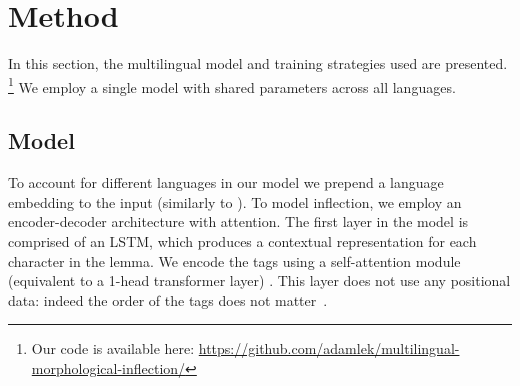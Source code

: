 \documentclass[11pt,a4paper]{article}
\begin{document}





\section{Method}

In this section, the multilingual model and training strategies used
are presented. \footnote{Our code is available here:
\url{https://github.com/adamlek/multilingual-morphological-inflection/}} We
employ a single model with shared parameters across all languages.

\subsection{Model}
To account for different languages in our model we prepend a language
embedding to the input (similarly to ).  To model inflection, we employ an
encoder-decoder architecture with attention. The first layer in the
model is comprised of an LSTM, which produces a contextual
representation for each character in the lemma.  We encode the tags
using a self-attention module (equivalent to a 1-head transformer
layer) \cite{DBLP:conf/nips/VaswaniSPUJGKP17}.  This layer does not
use any positional data: indeed the order of the tags does not
matter~\cite{DBLP:conf/emnlp/AnastasopoulosN19}.
\end{document}
